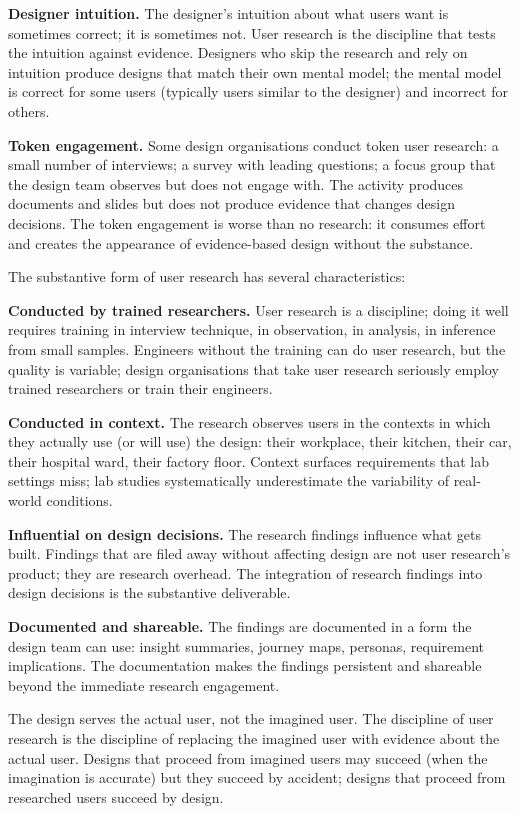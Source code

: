 \textbf{Designer intuition.} The designer's intuition about what users want is sometimes correct; it is sometimes not. User research is the discipline that tests the intuition against evidence. Designers who skip the research and rely on intuition produce designs that match their own mental model; the mental model is correct for some users (typically users similar to the designer) and incorrect for others.

\textbf{Token engagement.} Some design organisations conduct token user research: a small number of interviews; a survey with leading questions; a focus group that the design team observes but does not engage with. The activity produces documents and slides but does not produce evidence that changes design decisions. The token engagement is worse than no research: it consumes effort and creates the appearance of evidence-based design without the substance.

The substantive form of user research has several characteristics:

\textbf{Conducted by trained researchers.} User research is a discipline; doing it well requires training in interview technique, in observation, in analysis, in inference from small samples. Engineers without the training can do user research, but the quality is variable; design organisations that take user research seriously employ trained researchers or train their engineers.

\textbf{Conducted in context.} The research observes users in the contexts in which they actually use (or will use) the design: their workplace, their kitchen, their car, their hospital ward, their factory floor. Context surfaces requirements that lab settings miss; lab studies systematically underestimate the variability of real-world conditions.

\textbf{Influential on design decisions.} The research findings influence what gets built. Findings that are filed away without affecting design are not user research's product; they are research overhead. The integration of research findings into design decisions is the substantive deliverable.

\textbf{Documented and shareable.} The findings are documented in a form the design team can use: insight summaries, journey maps, personas, requirement implications. The documentation makes the findings persistent and shareable beyond the immediate research engagement.

\begin{principle}
The design serves the actual user, not the imagined user. The discipline of user research is the discipline of replacing the imagined user with evidence about the actual user. Designs that proceed from imagined users may succeed (when the imagination is accurate) but they succeed by accident; designs that proceed from researched users succeed by design.
\end{principle}

